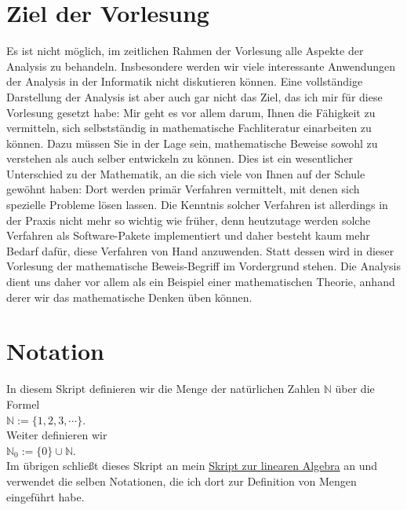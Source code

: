 \section{Ziel der Vorlesung}
Es ist nicht m\"oglich, im zeitlichen Rahmen der Vorlesung alle Aspekte der Analysis zu behandeln.
Insbesondere werden wir viele interessante Anwendungen der Analysis in der Informatik nicht
diskutieren k\"onnen.  Eine vollst\"andige Darstellung der Analysis ist aber auch gar nicht das Ziel,
das ich mir f\"ur diese Vorlesung gesetzt habe:  Mir geht es vor allem  darum, Ihnen die F\"ahigkeit zu
vermitteln, sich selbstst\"andig in mathematische Fachliteratur einarbeiten zu k\"onnen.  Dazu m\"ussen
Sie in der Lage 
sein, mathematische Beweise sowohl zu verstehen als auch selber entwickeln zu k\"onnen.   Dies ist ein
wesentlicher Unterschied zu der Mathematik, an die sich viele von Ihnen auf der Schule gew\"ohnt haben:
Dort werden prim\"ar Verfahren vermittelt, mit denen sich spezielle Probleme l\"osen lassen.  Die Kenntnis
solcher Verfahren ist allerdings in der Praxis nicht mehr so wichtig wie fr\"uher, denn heutzutage
werden solche Verfahren als Software-Pakete implementiert und daher besteht kaum mehr Bedarf daf\"ur,
diese Verfahren von Hand anzuwenden.  Statt dessen wird in
dieser Vorlesung der mathematische Beweis-Begriff im Vordergrund stehen.  Die Analysis dient uns
daher vor allem als ein Beispiel einer mathematischen Theorie, anhand derer wir das mathematische 
Denken \"uben k\"onnen. 

\section{Notation}
In diesem Skript definieren wir die Menge der nat\"urlichen Zahlen $\mathbb{N}$ \"uber die Formel
\\[0.2cm]
\hspace*{1.3cm}
$\mathbb{N} := \{ 1, 2, 3, \cdots \}$.
\\[0.2cm]
Weiter definieren wir
\\[0.2cm]
\hspace*{1.3cm}
$\mathbb{N}_0 := \{ 0 \} \cup \mathbb{N}$.
\\[0.2cm]
Im \"ubrigen schlie\ss{}t dieses Skript an mein
\href{https://github.com/karlstroetmann/Lineare-Algebra/blob/master/Script/lineare-algebra.pdf}{Skript zur linearen Algebra} 
an und verwendet die selben Notationen, die ich dort zur Definition von Mengen eingef\"uhrt habe.
\pagebreak

